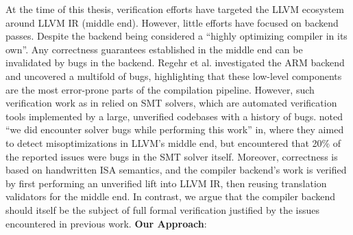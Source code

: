 \documentclass[review, anonymous, acmsmall, screen]{acmart}
\begin{document}
At the time of this thesis, verification efforts have targeted the LLVM ecosystem around LLVM IR 
(middle end). However, little efforts have focused on backend passes. Despite the backend being considered a ``highly
optimizing compiler in its own''. Any correctness guarantees established in the middle
end can be invalidated by bugs in the backend. Regehr et al. investigated the ARM
backend and uncovered a multifold of bugs, highlighting that these low-level components are the most
error-prone parts of the compilation pipeline. However, such  verification work as in
relied on SMT solvers, which are automated verification tools implemented by a large, unverified 
codebases with a history of bugs.  noted ``we did encounter solver bugs while performing 
this work'' in, where they aimed to detect misoptimizations in LLVM’s middle end, but encountered that
20\% of the reported issues were bugs in the SMT solver itself. Moreover, correctness is based on 
handwritten ISA semantics, and the compiler backend's work is verified by first performing an unverified
lift into LLVM IR, then reusing translation validators for the middle end. In contrast, we argue that the
compiler backend should itself be the subject of full formal verification justified by the issues 
encountered in previous work.\newline
\textbf{Our Approach}:
\end{document}

